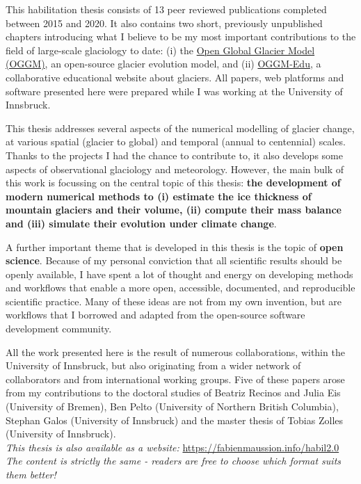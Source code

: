 

This habilitation thesis consists of 13 peer reviewed publications completed
between 2015 and 2020. It also contains two short, previously unpublished chapters
introducing what I believe to be my most important contributions to the field of
large-scale glaciology to date: (i) the \href{https://oggm.org}{Open Global Glacier Model (OGGM)},
an open-source glacier evolution model, and (ii) \href{https://edu.oggm.org}{OGGM-Edu},
a collaborative educational website about glaciers. All papers, web platforms
and software presented here were prepared while I was working at the University of Innsbruck.

This thesis addresses several aspects of the numerical modelling of glacier change,
at various spatial (glacier to global) and temporal (annual to centennial) scales. Thanks to
the projects I had the chance to contribute to, it also develops some aspects of observational
glaciology and meteorology. However, the main bulk of this work is focussing on the central
topic of this thesis: \textbf{the development of modern numerical methods to (i) estimate the ice
thickness of mountain glaciers and their volume, (ii) compute their mass balance and (iii)
simulate their evolution under climate change}.

A further important theme that is developed in this thesis is the topic of \textbf{open science}.
Because of my personal conviction that all scientific results should be openly available, I have
spent a lot of thought and energy on developing methods and workflows that enable a more open,
accessible, documented, and reproducible scientific practice. Many of these ideas are not from my
own invention, but are workflows that I borrowed and adapted from the open-source software
development community.

All the work presented here is the result of numerous collaborations, within the University of Innsbruck,
but also originating from a wider network of collaborators and from international working groups.
Five of these papers arose from my contributions
to the doctoral studies of Beatriz Recinos and Julia Eis (University of Bremen), Ben Pelto (University of
Northern British Columbia), Stephan Galos (University of Innsbruck) and the master thesis of
Tobias Zolles (University of Innsbruck). \\ [0.8cm]

\textit{This thesis is also available as a website:}
\href{https://fabienmaussion.info/habil2.0}{https://fabienmaussion.info/habil2.0} \\
\textit{The content is strictly the same - readers are free to choose which format suits them better!}

